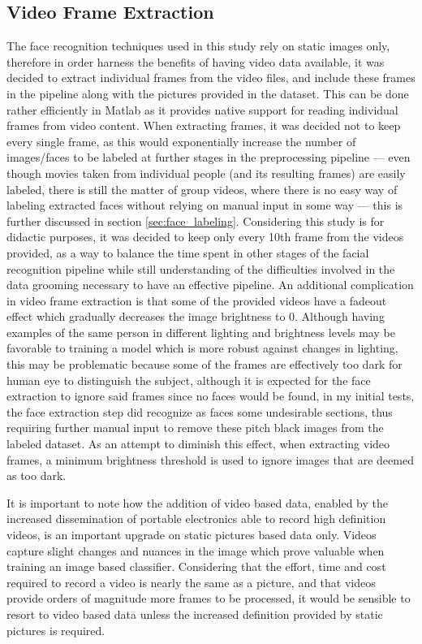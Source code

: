 \documentclass[11pt]{article}
\begin{document}
    \subsection{Video Frame Extraction}
        The face recognition techniques used in this study rely on static images only, therefore in order harness the benefits of having video data available, it was decided to extract individual frames from the video files, and include these frames in the pipeline along with the pictures provided in the dataset. This can be done rather efficiently in Matlab as it provides native support for reading individual frames from video content. When extracting frames, it was decided not to keep every single frame, as this would exponentially increase the number of images/faces to be labeled at further stages in the preprocessing pipeline --- even though movies taken from individual people (and its resulting frames) are easily labeled, there is still the matter of group videos, where there is no easy way of labeling extracted faces without relying on manual input in some way --- this is further discussed in section \ref{sec:face_labeling}. Considering this study is for didactic purposes, it was decided to keep only every 10th frame from the videos provided, as a way to balance the time spent in other stages of the facial recognition pipeline while still understanding of the difficulties involved in the data grooming necessary to have an effective pipeline. An additional complication in video frame extraction is that some of the provided videos have a fadeout effect which gradually decreases the image brightness to 0. Although having examples of the same person in different lighting and brightness levels may be favorable to training a model which is more robust against changes in lighting, this may be problematic because some of the frames are effectively too dark for human eye to distinguish the subject, although it is expected for the face extraction to ignore said frames since no faces would be found, in my initial tests, the face extraction step did recognize as faces some undesirable sections, thus requiring further manual input to remove these pitch black images from the labeled dataset. As an attempt to diminish this effect, when extracting video frames, a minimum brightness threshold is used to ignore images that are deemed as too dark.

        It is important to note how the addition of video based data, enabled by the increased dissemination of portable electronics able to record high definition videos, is an important upgrade on static pictures based data only. Videos capture slight changes and nuances in the image which prove valuable when training an image based classifier. Considering that the effort, time and cost required to record a video is nearly the same as a picture, and that videos provide orders of magnitude more frames to be processed, it would be sensible to resort to video based data unless the increased definition provided by static pictures is required.
\end{document}
